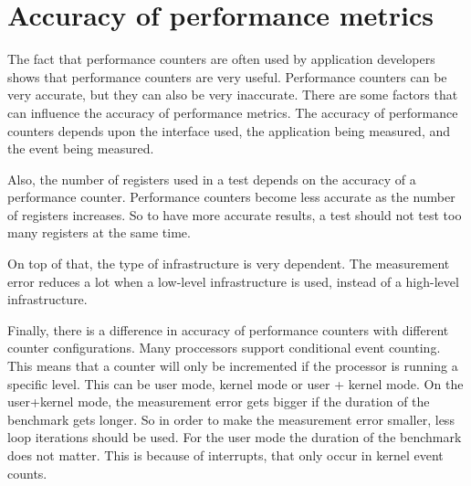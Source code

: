 \section{Accuracy of performance metrics}
The fact that performance counters are often used by application developers shows that performance counters are very useful. Performance counters can be very accurate, but they can also be very inaccurate. There are some factors that can influence the accuracy of performance metrics. {The accuracy of performance counters depends upon the interface used, the application being measured, and the event being measured}\cite{korn2001just}.

Also, the number of registers used in a test depends on the accuracy of a performance counter. Performance counters become less accurate as the number of registers increases. So to have more accurate results, a test should not test too many registers at the same time.

On top of that, the type of infrastructure is very dependent. The measurement error reduces a lot when a low-level infrastructure is used, instead of a high-level infrastructure.

Finally, there is a difference in accuracy of performance counters with different counter configurations. Many proccessors support conditional event counting. This means that a counter will only be incremented if the processor is running a specific level. This can be user mode, kernel mode or user + kernel mode. On the user+kernel mode, the measurement error gets bigger if the duration of the benchmark gets longer. \cite{AccuracyPerformanceCounter} So in order to make the measurement error smaller, less loop iterations should be used. For the user mode the duration of the benchmark does not matter. This is because of interrupts, that only occur in kernel event counts.



